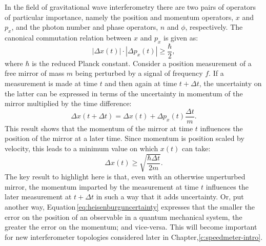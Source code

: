 In the field of gravitational wave interferometry there are two pairs of operators of particular importance, namely the position and momentum operators, $x$ and $p_x$, and the photon number and phase operators, $n$ and $\phi$, respectively. The canonical commutation relation between $x$ and $p_x$ is given as:
\begin{equation}
 | \Delta x\left( t \right) | \cdot |\Delta p_x\left( t \right) | \geq
\frac{\hbar}{2},
 \label{eq:heisenburguncertainty}
\end{equation}
where $\hbar$ is the reduced Planck constant. Consider a position measurement of a free mirror of mass $m$ being perturbed by a signal of frequency $f$. If a measurement is made at time $t$ and then again at time $t + \Delta t$, the uncertainty on the latter can be expressed in terms of the uncertainty in momentum of the mirror multiplied by the time difference:
\begin{equation}
 \Delta x \left( t + \Delta t \right) = \Delta x \left( t \right) + \Delta p_x
\left( t \right) \frac{\Delta t}{m}.
 \label{eq:heisenburgtime}
\end{equation}
This result shows that the momentum of the mirror at time $t$ influences the position of the mirror at a later time. Since momentum is position scaled by velocity, this leads to a minimum value on which $x \left( t \right)$ can take:
\begin{equation}
 \Delta x \left( t \right) \geq \sqrt{\frac{\hbar \Delta t}{2m}}.
\end{equation}
The key result to highlight here is that, even with an otherwise unperturbed mirror, the momentum imparted by the measurement at time $t$ influences the later measurement at $t + \Delta t$ in such a way that it adds uncertainty. Or, put another way, Equation\,\ref{eq:heisenburguncertainty} expresses that the smaller the error on the position of an observable in a quantum mechanical system, the greater the error on the momentum; and vice-versa. This will become important for new interferometer topologies considered later in Chapter,\ref{c:speedmeter-intro}.

